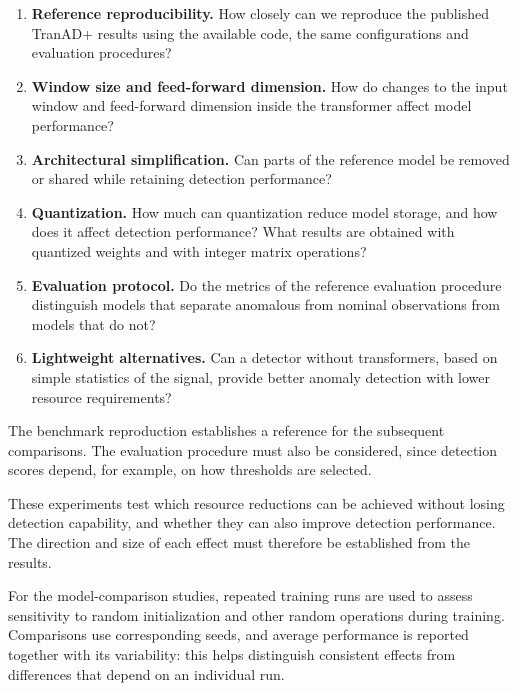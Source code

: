 \begin{enumerate}[label=\arabic*.]
  \item \textbf{Reference reproducibility.}
  How closely can we reproduce the published TranAD+ results using
  the available code, the same configurations and evaluation procedures?

  \item \textbf{Window size and feed-forward dimension.}
  How do changes to the input window and feed-forward dimension inside the transformer affect
  model performance?

  \item \textbf{Architectural simplification.}
  Can parts of the reference model be removed or shared while retaining
  detection performance?

  \item \textbf{Quantization.}
  How much can quantization reduce model storage, and how does it affect
  detection performance? What results are obtained with quantized weights
  and with integer matrix operations?

  \item \textbf{Evaluation protocol.}
  Do the metrics of the reference evaluation procedure distinguish
  models that separate anomalous from nominal observations from models
  that do not?

  \item \textbf{Lightweight alternatives.}
  Can a detector without transformers, based on simple statistics
  of the signal, provide better anomaly detection with lower resource
  requirements?
\end{enumerate}

The benchmark reproduction establishes a reference for the subsequent
comparisons. The evaluation procedure must also be considered, since
detection scores depend, for example, on how thresholds are selected.

These experiments test which resource reductions can be achieved
without losing detection capability, and whether they can also improve
detection performance. The direction and
size of each effect must therefore be established from the results.

For the model-comparison studies, repeated training runs are used
to assess sensitivity to random initialization and other random
operations during training. Comparisons use corresponding seeds,
and average performance is reported together with its variability:
this helps distinguish consistent effects from differences that
depend on an individual run.

